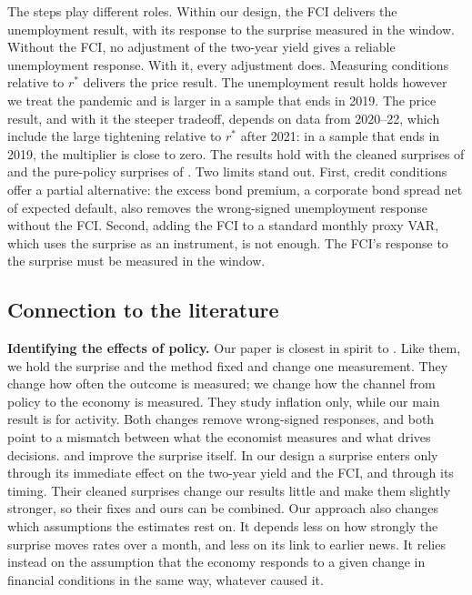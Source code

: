 \documentclass[11pt]{article}
\newcommand{\rs}{r^{*}}
\begin{document}
The steps play different roles. Within our design, the FCI delivers the unemployment result, with its response to the surprise measured in the window. Without the FCI, no adjustment of the two-year yield gives a reliable unemployment response. With it, every adjustment does. Measuring conditions relative to $\rs$ delivers the price result. The unemployment result holds however we treat the pandemic and is larger in a sample that ends in 2019. The price result, and with it the steeper tradeoff, depends on data from 2020--22, which include the large tightening relative to $\rs$ after 2021: in a sample that ends in 2019, the multiplier is close to zero. The results hold with the cleaned surprises of \citet{bauer2023} and the pure-policy surprises of \citet{jarocinski2020}. Two limits stand out. First, credit conditions offer a partial alternative: the excess bond premium, a corporate bond spread net of expected default, also removes the wrong-signed unemployment response without the FCI. Second, adding the FCI to a standard monthly proxy VAR, which uses the surprise as an instrument, is not enough. The FCI's response to the surprise must be measured in the window.

\subsection{Connection to the literature}
\textbf{Identifying the effects of policy.} Our paper is closest in spirit to \citet{jacobson2026}. Like them, we hold the surprise and the method fixed and change one measurement. They change how often the outcome is measured; we change how the channel from policy to the economy is measured. They study inflation only, while our main result is for activity. Both changes remove wrong-signed responses, and both point to a mismatch between what the economist measures and what drives decisions. \citet{bauer2023} and \citet{jarocinski2020} improve the surprise itself. In our design a surprise enters only through its immediate effect on the two-year yield and the FCI, and through its timing. Their cleaned surprises change our results little and make them slightly stronger, so their fixes and ours can be combined. Our approach also changes which assumptions the estimates rest on. It depends less on how strongly the surprise moves rates over a month, and less on its link to earlier news. It relies instead on the assumption that the economy responds to a given change in financial conditions in the same way, whatever caused it.
\end{document}
